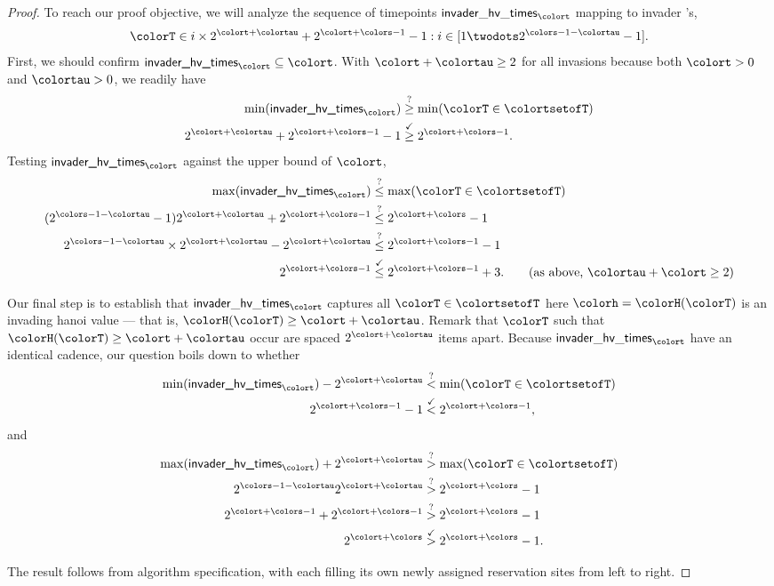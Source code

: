 \begin{proof}
To reach our proof objective, we will analyze the sequence of timepoints $\mathsf{invader\_hv\_times}_{\colort}$ mapping to invader \hv{}'s,
\begin{align*}
\colorT \in i \times 2^{\colort + \colortau} +
2^{\colort + \colors - 1} - 1
:
i \in [1 \twodots 2^{\colors - 1 - \colortau} - 1].
\end{align*}
First, we should confirm $\textsf{invader\_hv\_times}_{\colort} \subseteq \colort$.
With $\colort + \colortau \geq 2$ for all invasions because both $\colort > 0$ and $\colortau > 0$, we readily have
\begin{align*}
\min(\textsf{invader\_hv\_times}_{\colort})
&\stackrel{?}{\geq}
\min(\colorT \in \colortsetofT)\\
2^{\colort + \colortau} + 2^{\colort + \colors - 1} - 1
&\stackrel{\checkmark}{\geq}
2^{\colort + \colors - 1}.
\end{align*}
Testing $\textsf{invader\_hv\_times}_{\colort}$ against the upper bound of $\colort$,
\begin{align*}
\max(\textsf{invader\_hv\_times}_{\colort})
&\stackrel{?}{\leq}
\max(\colorT \in \colortsetofT)
\\
(2^{\colors - 1 - \colortau}  - 1)
2^{\colort + \colortau} + 2^{\colort + \colors - 1}
&\stackrel{?}{\leq}
2^{\colort + \colors} - 1
\\
2^{\colors - 1 - \colortau} \times 2^{\colort + \colortau} - 2^{\colort + \colortau}
&\stackrel{?}{\leq}
2^{\colort + \colors - 1} - 1
\\
2^{\colort + \colors - 1}
&\stackrel{\checkmark}{\leq}
2^{\colort + \colors - 1} + 3.
\tag{as above, $\colortau + \colort \geq 2$}
\end{align*}

Our final step is to establish that $\mathsf{invader\_hv\_times}_{\colort}$ captures all $\colorT \in \colortsetofT$ here $\colorh = \colorH(\colorT)$ is an invading hanoi value --- that is, $\colorH(\colorT) \geq \colort + \colortau$.
Remark that $\colorT$ such that $\colorH(\colorT) \geq \colort + \colortau$ occur are spaced $2^{\colort + \colortau}$ items apart.
Because $\mathsf{invader\_hv\_times}_{\colort}$ have an identical cadence, our question boils down to whether
\begin{align*}
\min(\textsf{invader\_hv\_times}_{\colort})
- 2^{\colort + \colortau}
&\stackrel{?}{<}
\min(\colorT \in \colortsetofT)\\
2^{\colort + \colors - 1} - 1
&\stackrel{\checkmark}{<}
2^{\colort + \colors - 1},
\end{align*}
and
\begin{align*}
\max(\textsf{invader\_hv\_times}_{\colort})
+ 2^{\colort + \colortau}
&\stackrel{?}{>}
\max(\colorT \in \colortsetofT)\\
2^{\colors - 1 - \colortau} 2^{\colort + \colortau}
&\stackrel{?}{>}
2^{\colort + \colors} - 1\\
2^{\colort + \colors - 1}
+ 2^{\colort + \colors - 1}
&\stackrel{?}{>}
2^{\colort + \colors} - 1\\
2^{\colort + \colors}
&\stackrel{\checkmark}{>}
2^{\colort + \colors} - 1.
\end{align*}

The result follows from algorithm specification, with each \hv{} filling its own newly assigned reservation sites from left to right.
\end{proof}
